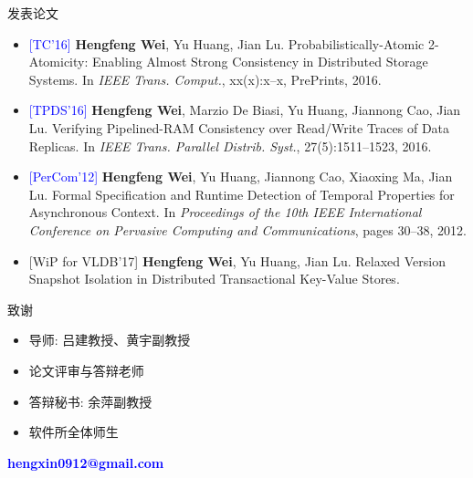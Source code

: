 \begin{frame}{发表论文}

  {\small
  \begin{itemize}
	\item \textcolor{blue}{[TC'16]} {\bf Hengfeng Wei}, Yu Huang, Jian Lu. 
	  Probabilistically-Atomic 2-Atomicity: Enabling Almost Strong Consistency in Distributed Storage Systems. 
	  In {\it IEEE Trans. Comput.}, xx(x):x--x, PrePrints, 2016.
	\item \textcolor{blue}{[TPDS'16]} {\bf Hengfeng Wei}, Marzio De Biasi, Yu Huang, Jiannong Cao, Jian Lu. 
	  Verifying Pipelined-RAM Consistency over Read/Write Traces of Data Replicas.
	  In {\it IEEE Trans. Parallel Distrib. Syst.}, 27(5):1511--1523, 2016.
	\item \textcolor{blue}{[PerCom'12]} {\bf Hengfeng Wei}, Yu Huang, Jiannong Cao, Xiaoxing Ma, Jian Lu. 
	  Formal Specification and Runtime Detection of Temporal Properties for Asynchronous Context. 
	  In {\it Proceedings of the 10th IEEE International Conference on Pervasive Computing and Communications},
	  pages 30--38, 2012.
	\item \textcolor{blue!50!gray}{[WiP for VLDB'17]} {\bf Hengfeng Wei}, Yu Huang, Jian Lu.
	  Relaxed Version Snapshot Isolation in Distributed Transactional Key-Value Stores. 
  \end{itemize}
  }
\end{frame}
\begin{frame}{致谢}
  \begin{itemize}
	\setlength{\itemsep}{15pt}
	\item 导师: 吕建教授、黄宇副教授
	\item 论文评审与答辩老师
	\item 答辩秘书: 余萍副教授
	\item 软件所全体师生
  \end{itemize}
\end{frame}
\begin{frame}[noframenumbering]
  \vspace{-0.8cm}
  \begin{center}
    \textcolor{blue}{\bf \large hengxin0912@gmail.com}
  \end{center}
  \vspace{-0.5cm}
\end{frame}
